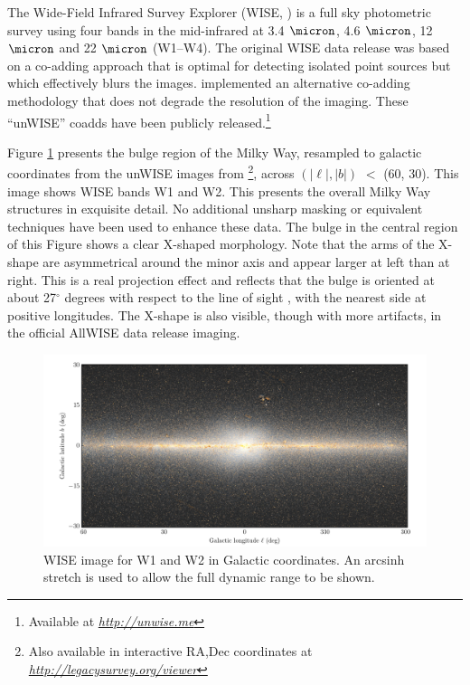 \documentclass[12pt, preprint]{aastex}
\newcommand{\niceurl}[1]{\href{#1}{\textsl{#1}}}
\newcommand{\viewerurl}{\niceurl{http://legacysurvey.org/viewer}}
\begin{document}
The Wide-Field Infrared Survey Explorer (WISE, \citet{W2010}) is a full sky photometric survey using four bands in the mid-infrared at 3.4 $\micron$, 4.6 $\micron$, 12 $\micron$ and 22 $\micron$ (W1--W4). The original WISE data release was based on a co-adding approach that is optimal for detecting isolated point sources but which effectively blurs the images. \citet{Lang2014b} implemented an alternative co-adding methodology that does not degrade the resolution of the imaging.  These ``unWISE'' coadds have been publicly released.\footnote{Available at \niceurl{http://unwise.me}}

Figure \ref{fig:xbulge} presents the bulge region of the Milky Way,  resampled to galactic coordinates from the unWISE images from \citet{Lang2014a} \footnote{Also available in interactive RA,Dec coordinates at \viewerurl}, across $(|\ell|,|b|)$ $<$ (60, 30).  This image shows WISE bands W1 and W2. This presents the overall Milky Way structures in exquisite detail.
No additional unsharp masking or equivalent techniques have been used to enhance these data. The bulge in the central region of this Figure shows a clear X-shaped morphology. Note that the arms of the X-shape are asymmetrical around the minor axis and appear larger at left than at right. This is a real projection effect and reflects that the bulge is oriented at about 27$^\circ$ degrees with respect to the line of sight \citep{Wegg2013}, with the nearest side at positive longitudes. The X-shape is also visible, though with more artifacts, in the official AllWISE data release imaging.


\begin{figure}[h!]
\centering
        \includegraphics[width=\textwidth]{xbulge-00}
\caption{WISE image for W1 and W2 in Galactic coordinates.  An arcsinh
  stretch is used to allow the full dynamic range to be shown.}
\label{fig:xbulge}
\end{figure}
\end{document}
